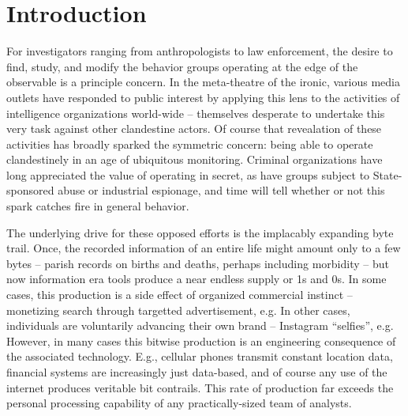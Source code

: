 \documentclass{article}
\newcommand{\todoCP}[1]{\todo{CP, #1}}
\begin{document}

\newpage

\section*{Introduction}
For investigators ranging from anthropologists to law enforcement, the desire to find, study, and modify the behavior groups operating at the edge of the observable is a principle concern.  In the meta-theatre of the ironic, various media outlets have responded to public interest by applying this lens to the activities of intelligence organizations world-wide -- themselves desperate to undertake this very task against other clandestine actors.  Of course that revealation of these activities has broadly sparked the symmetric concern: being able to operate clandestinely in an age of ubiquitous monitoring.  Criminal organizations have long appreciated the value of operating in secret, as have groups subject to State-sponsored abuse or industrial espionage, and time will tell whether or not this spark catches fire in general behavior.

The underlying drive for these opposed efforts is the implacably expanding byte trail.  Once, the recorded information of an entire life might amount only to a few bytes -- parish records on births and deaths, perhaps including morbidity -- but now information era tools produce a near endless supply or 1s and 0s.  In some cases, this production is a side effect of organized commercial instinct -- monetizing search through targetted advertisement, e.g.  In other cases, individuals are voluntarily advancing their own brand -- Instagram ``selfies'', e.g.  However, in many cases this bitwise production is an engineering consequence of the associated technology.  E.g., cellular phones transmit constant location data, financial systems are increasingly just data-based, and of course any use of the internet produces veritable bit contrails.  This rate of production far exceeds the personal processing capability of any practically-sized team of analysts.
\end{document}
